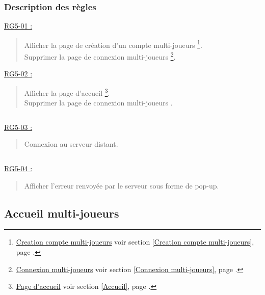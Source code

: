 \documentclass{report}
\begin{document}
		\subsubsection{Description des règles}

			\underline{RG5-01 :}
				\begin{quote}
					Afficher la page de création d'un compte multi-joueurs%
						\footnote[1]{
							\hyperlink{Creation compte multi-joueurs}{Creation compte multi-joueurs}
							\og voir section \ref{Creation compte multi-joueurs}, page \pageref{Creation compte multi-joueurs}.\fg
						}.\\
					Supprimer la page de connexion multi-joueurs%
						\footnote[2]{
							\hyperlink{Connexion multi-joueurs}{Connexion multi-joueurs}
							\og voir section \ref{Connexion multi-joueurs}, page \pageref{Connexion multi-joueurs}.\fg
						}.\\
				\end{quote}	

				
			\underline{RG5-02 :}
				\begin{quote}
					Afficher la page d'accueil%
						\footnote[3]{
							\hyperlink{Page d'accueil}{Page d'accueil}
							\og voir section \ref{Accueil}, page \pageref{Accueil}.\fg
						}.\\
					Supprimer la page de connexion multi-joueurs \footnotemark[2].		
				\end{quote}	
				
			$\,$
				
			\underline{RG5-03 :}
				\begin{quote}
					Connexion au serveur distant.			
				\end{quote}
				
			$\,$
			
			\underline{RG5-04 :}
				\begin{quote}
					Afficher l'erreur renvoyée par le serveur sous forme de pop-up.
				\end{quote}

\newpage

	\subsection{Accueil multi-joueurs}

		\hypertarget{Accueil multi-joueurs}{}
		\label{Accueil multi-joueurs}

		\begin{center}
			
		\end{center}
\end{document}

